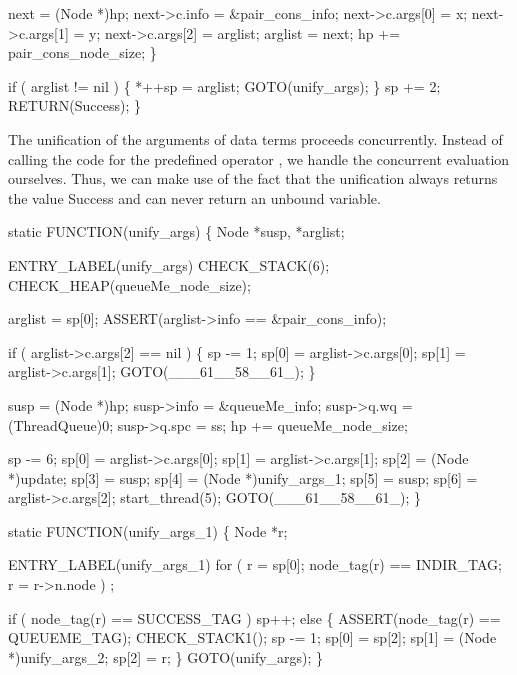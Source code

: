         next            = (Node *)hp;
        next->c.info    = &pair_cons_info;
        next->c.args[0] = x;
        next->c.args[1] = y;
        next->c.args[2] = arglist;
        arglist         = next;
        hp             += pair_cons_node_size;
    \}

    if ( arglist != nil )
    \{
        *++sp = arglist;
        GOTO(unify_args);
    \}
    sp += 2;
    RETURN(Success);
\}

\nwendcode{}\nwdocspar
The unification of the arguments of data terms proceeds
concurrently. Instead of calling the code for the predefined operator
{\Tt{}{\&}\nwendquote}, we handle the concurrent evaluation ourselves. Thus, we can
make use of the fact that the unification always returns the value
{\Tt{}Success\nwendquote} and can never return an unbound variable.

\nwenddocs{}\plusendmoddef\nwstartdeflinemarkup{}\nwenddeflinemarkup
static
FUNCTION(unify_args)
\{
    Node *susp, *arglist;

 ENTRY_LABEL(unify_args)
    CHECK_STACK(6);
    CHECK_HEAP(queueMe_node_size);

    arglist = sp[0];
    ASSERT(arglist->info == &pair_cons_info);

    if ( arglist->c.args[2] == nil )
    \{
        sp   -= 1;
        sp[0] = arglist->c.args[0];
        sp[1] = arglist->c.args[1];
        GOTO(___61__58__61_);
    \}

    susp        = (Node *)hp;
    susp->info  = &queueMe_info;
    susp->q.wq  = (ThreadQueue)0;
    susp->q.spc = ss;
    hp         += queueMe_node_size;

    sp   -= 6;
    sp[0] = arglist->c.args[0];
    sp[1] = arglist->c.args[1];
    sp[2] = (Node *)update;
    sp[3] = susp;
    sp[4] = (Node *)unify_args_1;
    sp[5] = susp;
    sp[6] = arglist->c.args[2];
    start_thread(5);
    GOTO(___61__58__61_);
\}

static
FUNCTION(unify_args_1)
\{
    Node *r;

 ENTRY_LABEL(unify_args_1)
    for ( r = sp[0]; node_tag(r) == INDIR_TAG; r = r->n.node )
        ;

    if ( node_tag(r) == SUCCESS_TAG )
        sp++;
    else
    \{
        ASSERT(node_tag(r) == QUEUEME_TAG);
        CHECK_STACK1();
        sp   -= 1;
        sp[0] = sp[2];
        sp[1] = (Node *)unify_args_2;
        sp[2] = r;
    \}
    GOTO(unify_args);
\}

